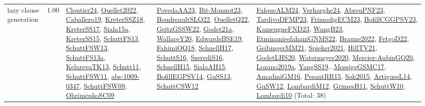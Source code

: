 {\begin{longtable}{p{3cm}r>{\raggedright\arraybackslash}p{6cm}>{\raggedright\arraybackslash}p{6cm}>{\raggedright\arraybackslash}p{8cm}}
\index{lazy clause generation}\index{Algorithms!lazy clause generation}lazy clause generation &  1.00 & \hyperref[detail:Cloutier24]{Cloutier24}, \hyperref[detail:Ouellet2022]{Ouellet2022}, \hyperref[detail:Caballero19]{Caballero19}, \hyperref[detail:KreterSSZ18]{KreterSSZ18}, \hyperref[detail:KreterSS17]{KreterSS17}, \hyperref[detail:Siala15a]{Siala15a}, \hyperref[detail:KreterSS15]{KreterSS15}, \hyperref[detail:SchuttFS13]{SchuttFS13}, \hyperref[detail:SchuttFSW13]{SchuttFSW13}, \hyperref[detail:SchuttFS13a]{SchuttFS13a}, \hyperref[detail:KelarevaTK13]{KelarevaTK13}, \hyperref[detail:Schutt11]{Schutt11}, \hyperref[detail:SchuttFSW11]{SchuttFSW11}, \hyperref[detail:abs-1009-0347]{abs-1009-0347}, \hyperref[detail:SchuttFSW09]{SchuttFSW09}, \hyperref[detail:OhrimenkoSC09]{OhrimenkoSC09} & \hyperref[detail:PovedaAA23]{PovedaAA23}, \hyperref[detail:Bit-Monnot23]{Bit-Monnot23}, \hyperref[detail:BoudreaultSLQ22]{BoudreaultSLQ22}, \hyperref[detail:OuelletQ22]{OuelletQ22}, \hyperref[detail:GeitzGSSW22]{GeitzGSSW22}, \hyperref[detail:Godet21a]{Godet21a}, \hyperref[detail:WallaceY20]{WallaceY20}, \hyperref[detail:EdwardsBSE19]{EdwardsBSE19}, \hyperref[detail:FahimiOQ18]{FahimiOQ18}, \hyperref[detail:SchnellH17]{SchnellH17}, \hyperref[detail:SchuttS16]{SchuttS16}, \hyperref[detail:SzerediS16]{SzerediS16}, \hyperref[detail:SchnellH15]{SchnellH15}, \hyperref[detail:SialaAH15]{SialaAH15}, \hyperref[detail:BofillEGPSV14]{BofillEGPSV14}, \hyperref[detail:GuSS13]{GuSS13}, \hyperref[detail:SchuttCSW12]{SchuttCSW12} & \hyperref[detail:FalqueALM24]{FalqueALM24}, \hyperref[detail:Verhaeghe24]{Verhaeghe24}, \hyperref[detail:AbreuPNF23]{AbreuPNF23}, \hyperref[detail:TardivoDFMP23]{TardivoDFMP23}, \hyperref[detail:FrimodigECM23]{FrimodigECM23}, \hyperref[detail:BofillCGGPSV23]{BofillCGGPSV23}, \hyperref[detail:KameugneFND23]{KameugneFND23}, \hyperref[detail:WangB23]{WangB23}, \hyperref[detail:EtminaniesfahaniGNMS22]{EtminaniesfahaniGNMS22}, \hyperref[detail:Braune2022]{Braune2022}, \hyperref[detail:FetgoD22]{FetgoD22}, \hyperref[detail:GeibingerMM21]{GeibingerMM21}, \hyperref[detail:Spieker2021]{Spieker2021}, \hyperref[detail:HillTV21]{HillTV21}, \hyperref[detail:GodetLHS20]{GodetLHS20}, \hyperref[detail:Watermeyer2020]{Watermeyer2020}, \hyperref[detail:Mercier-AubinGQ20]{Mercier-AubinGQ20}, \hyperref[detail:Lozano2019a]{Lozano2019a}, \hyperref[detail:YangSS19]{YangSS19}...\hyperref[detail:MossigeGSMC17]{MossigeGSMC17}, \hyperref[detail:AmadiniGM16]{AmadiniGM16}, \hyperref[detail:PesantRR15]{PesantRR15}, \hyperref[detail:Soh2015]{Soh2015}, \hyperref[detail:ArtiguesL14]{ArtiguesL14}, \hyperref[detail:GuSW12]{GuSW12}, \hyperref[detail:LombardiM12]{LombardiM12}, \hyperref[detail:GrimesH11]{GrimesH11}, \hyperref[detail:SchuttW10]{SchuttW10}, \hyperref[detail:Lombardi10]{Lombardi10} (Total: 38)\\

\end{longtable}}
